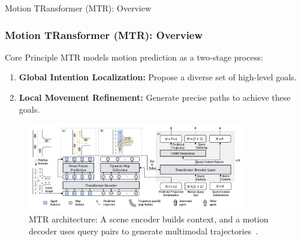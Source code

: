 \documentclass[10pt,aspectratio=169]{beamer}
\begin{document}
\begin{frame}{Motion TRansformer (MTR): Overview}
    \frametitle{Motion TRansformer (MTR): Overview}
    \begin{block}{Core Principle}
        MTR models motion prediction as a two-stage process:
        \begin{enumerate}
            \item \textbf{Global Intention Localization:} Propose a diverse set of high-level goals.
            \item \textbf{Local Movement Refinement:} Generate precise paths to achieve these goals.
        \end{enumerate}
    \end{block}
    \begin{figure}
        \centering
        \includegraphics[width=0.85\textwidth]{docs/latex/figures/mtr_overall_architecture_detail.png}
        \caption{MTR architecture: A scene encoder builds context, and a motion decoder uses query pairs to generate multimodal trajectories~\cite{Shi2022MTR}.}
        \label{fig:mtr_architecture_pres}
    \end{figure}
\end{frame}
\end{document}
